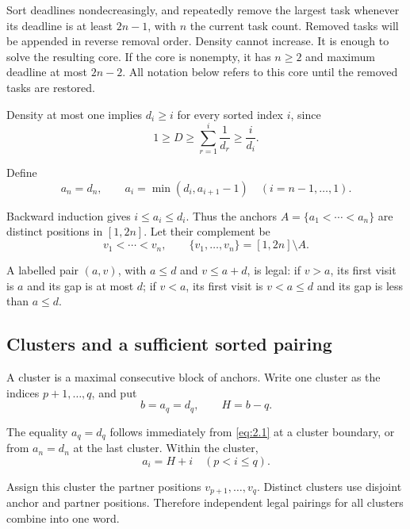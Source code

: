 \documentclass[11pt,a4paper]{article}
\begin{document}
Sort deadlines nondecreasingly, and repeatedly remove the largest task whenever its deadline is at least \(2n-1\), with \(n\) the current task count. Removed tasks will be appended in reverse removal order. Density cannot increase. It is enough to solve the resulting core. If the core is nonempty, it has \(n\ge2\) and maximum deadline at most \(2n-2\). All notation below refers to this core until the removed tasks are restored.

Density at most one implies \(d_i\ge i\) for every sorted index \(i\), since
\[
1\ge D\ge\sum_{r=1}^i\frac1{d_r}\ge\frac{i}{d_i}.
\]

Define
\begin{equation}
a_n=d_n,\qquad a_i=\min(d_i,a_{i+1}-1)\quad(i=n-1,\ldots,1).
\tag{2.1}
\label{eq:2.1}
\end{equation}

Backward induction gives \(i\le a_i\le d_i\). Thus the anchors \(A=\{a_1<\cdots<a_n\}\) are distinct positions in \([1,2n]\). Let their complement be
\begin{equation}
v_1<\cdots<v_n,\qquad \{v_1,\ldots,v_n\}=[1,2n]\setminus A.
\tag{2.2}
\label{eq:2.2}
\end{equation}

A labelled pair \((a,v)\), with \(a\le d\) and \(v\le a+d\), is legal: if \(v>a\), its first visit is \(a\) and its gap is at most \(d\); if \(v<a\), its first visit is \(v<a\le d\) and its gap is less than \(a\le d\).

\hypertarget{clusters-and-a-sufficient-sorted-pairing}{%
\subsection{Clusters and a sufficient sorted pairing}\label{clusters-and-a-sufficient-sorted-pairing}}

A cluster is a maximal consecutive block of anchors. Write one cluster as the indices \(p+1,\ldots,q\), and put
\[
b=a_q=d_q,\qquad H=b-q.
\]

The equality \(a_q=d_q\) follows immediately from \eqref{eq:2.1} at a cluster boundary, or from \(a_n=d_n\) at the last cluster. Within the cluster,
\begin{equation}
a_i=H+i\quad(p<i\le q).
\tag{2.3}
\label{eq:2.3}
\end{equation}

Assign this cluster the partner positions \(v_{p+1},\ldots,v_q\). Distinct clusters use disjoint anchor and partner positions. Therefore independent legal pairings for all clusters combine into one word.
\end{document}
